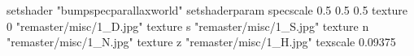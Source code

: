 setshader "bumpspecparallaxworld"
setshaderparam specscale 0.5 0.5 0.5
    texture 0 "remaster/misc/1_D.jpg"
    texture s "remaster/misc/1_S.jpg"
    texture n "remaster/misc/1_N.jpg"
    texture z "remaster/misc/1_H.jpg"
    texscale 0.09375